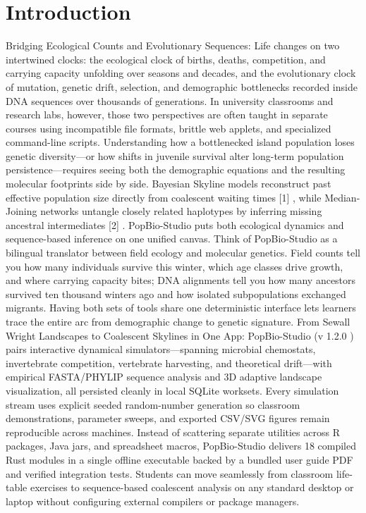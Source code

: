 \documentclass[10pt,letterpaper]{article}
\begin{document}
\section{Introduction}
Bridging Ecological Counts and Evolutionary Sequences: Life changes on two intertwined clocks: the ecological clock of births, deaths, competition, and carrying capacity unfolding over seasons and decades, and the evolutionary clock of mutation, genetic drift, selection, and demographic bottlenecks recorded inside DNA sequences over thousands of generations. In university classrooms and research labs, however, those two perspectives are often taught in separate courses using incompatible file formats, brittle web applets, and specialized command-line scripts. Understanding how a bottlenecked island population loses genetic diversity---or how shifts in juvenile survival alter long-term population persistence---requires seeing both the demographic equations and the resulting molecular footprints side by side. Bayesian Skyline models reconstruct past effective population size directly from coalescent waiting times [1] , while Median-Joining networks untangle closely related haplotypes by inferring missing ancestral intermediates [2] . PopBio-Studio puts both ecological dynamics and sequence-based inference on one unified canvas. Think of PopBio-Studio as a bilingual translator between field ecology and molecular genetics. Field counts tell you how many individuals survive this winter, which age classes drive growth, and where carrying capacity bites; DNA alignments tell you how many ancestors survived ten thousand winters ago and how isolated subpopulations exchanged migrants. Having both sets of tools share one deterministic interface lets learners trace the entire arc from demographic change to genetic signature. From Sewall Wright Landscapes to Coalescent Skylines in One App: PopBio-Studio (v 1.2.0 ) pairs interactive dynamical simulators---spanning microbial chemostats, invertebrate competition, vertebrate harvesting, and theoretical drift---with empirical FASTA/PHYLIP sequence analysis and 3D adaptive landscape visualization, all persisted cleanly in local SQLite worksets. Every simulation stream uses explicit seeded random-number generation so classroom demonstrations, parameter sweeps, and exported CSV/SVG figures remain reproducible across machines. Instead of scattering separate utilities across R packages, Java jars, and spreadsheet macros, PopBio-Studio delivers 18 compiled Rust modules in a single offline executable backed by a bundled user guide PDF and verified integration tests. Students can move seamlessly from classroom life-table exercises to sequence-based coalescent analysis on any standard desktop or laptop without configuring external compilers or package managers.
\end{document}
